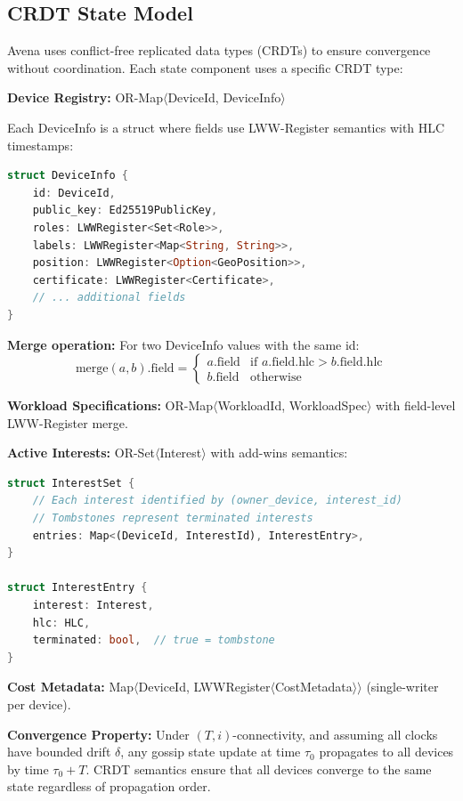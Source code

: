 \subsection{CRDT State Model}

Avena uses conflict-free replicated data types (CRDTs) to ensure convergence without coordination. Each state component uses a specific CRDT type:

\textbf{Device Registry:} OR-Map$\langle$DeviceId, DeviceInfo$\rangle$

Each DeviceInfo is a struct where fields use LWW-Register semantics with HLC timestamps:

\begin{lstlisting}[language=Rust]
struct DeviceInfo {
    id: DeviceId,
    public_key: Ed25519PublicKey,
    roles: LWWRegister<Set<Role>>,
    labels: LWWRegister<Map<String, String>>,
    position: LWWRegister<Option<GeoPosition>>,
    certificate: LWWRegister<Certificate>,
    // ... additional fields
}
\end{lstlisting}

\textbf{Merge operation:} For two DeviceInfo values with the same id:
\[
\text{merge}(a, b).\text{field} = 
\begin{cases}
a.\text{field} & \text{if } a.\text{field.hlc} > b.\text{field.hlc} \\
b.\text{field} & \text{otherwise}
\end{cases}
\]

\textbf{Workload Specifications:} OR-Map$\langle$WorkloadId, WorkloadSpec$\rangle$ with field-level LWW-Register merge.

\textbf{Active Interests:} OR-Set$\langle$Interest$\rangle$ with add-wins semantics:

\begin{lstlisting}[language=Rust]
struct InterestSet {
    // Each interest identified by (owner_device, interest_id)
    // Tombstones represent terminated interests
    entries: Map<(DeviceId, InterestId), InterestEntry>,
}

struct InterestEntry {
    interest: Interest,
    hlc: HLC,
    terminated: bool,  // true = tombstone
}
\end{lstlisting}

\textbf{Cost Metadata:} Map$\langle$DeviceId, LWWRegister$\langle$CostMetadata$\rangle\rangle$ (single-writer per device).

\textbf{Convergence Property:} Under $(T, i)$-connectivity, and assuming all clocks have bounded drift $\delta$, any gossip state update at time $\tau_0$ propagates to all devices by time $\tau_0 + T$. CRDT semantics ensure that all devices converge to the same state regardless of propagation order.


